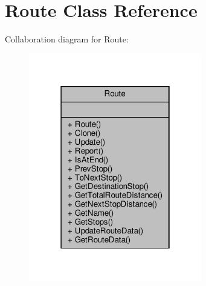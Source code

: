 \hypertarget{classRoute}{}\section{Route Class Reference}
\label{classRoute}


Collaboration diagram for Route\+:\nopagebreak
\begin{figure}[H]
\begin{center}
\leavevmode
\includegraphics[width=214pt]{classRoute__coll__graph}
\end{center}
\end{figure}

